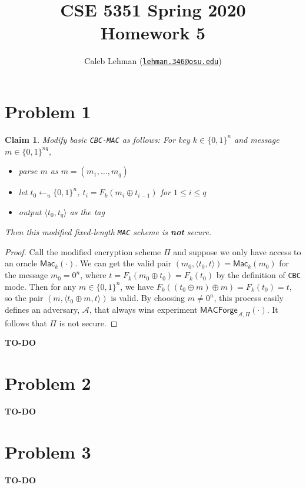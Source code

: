\documentclass[12pt]{article}
\title{%
CSE 5351 Spring 2020\\
Homework 5
}
\author{%
Caleb Lehman
(\href{mailto:lehman.346@osu.edu}{\texttt{lehman.346@osu.edu}})
}
\date{%
}
\numberwithin{equation}{section}
\theoremstyle{plain}
\newtheorem{claim}{Claim}
\newcommand{\set}[1]{\{ #1 \}}
\newcommand{\algo}[1]{\mathsf{#1}}
\newcommand{\adv}{\mathcal{A}}
\newcommand{\mac}{\algo{Mac}}
\newcommand{\macexpir}[2]{\algo{MACForge}_{{#1},{#2}}}
\begin{document}
\maketitle

\section*{Problem 1}

\begin{claim}
Modify basic \texttt{CBC-MAC} as follows:
For key $k \in \set{ 0, 1 }^n$ and message $m \in \set{ 0, 1 }^{nq}$,
\begin{itemize}
    \item parse $m$ as $m = (m_1, \ldots, m_q)$
    \item let $t_0 \gets_u \set{ 0, 1 }^n$,
    $t_i = F_k(m_i \oplus t_{i-1})$ for $1 \leq i \leq q$
    \item output $\langle t_0, t_q \rangle$ as the tag
\end{itemize}
Then this modified fixed-length \texttt{MAC} scheme is \textbf{not} secure.
\end{claim}
\begin{proof}
Call the modified encryption scheme $\Pi$
and suppose we only have access to an oracle $\mac_k(\cdot)$.
We can get the valid pair $(m_0, \langle t_0, t \rangle) = \mac_k(m_0)$ for the message $m_0 = 0^n$,
where $t = F_k(m_0 \oplus t_0) = F_k(t_0)$ by the definition of \texttt{CBC} mode.
Then for any $m \in \set{ 0, 1 }^n$, we have
$F_k((t_0 \oplus m) \oplus m) = F_k(t_0) = t$,
so the pair $(m, \langle t_0 \oplus m, t \rangle)$ is valid.
By choosing $m \neq 0^n$, this process easily defines an adversary, $\adv$,
that always wins experiment $\macexpir{\adv}{\Pi}(\cdot)$.
It follows that $\Pi$ is not secure.
\end{proof}

\textbf{TO-DO}

\section*{Problem 2}

\textbf{TO-DO}

\section*{Problem 3}

\textbf{TO-DO}
\end{document}
